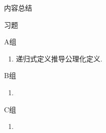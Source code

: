 \vspace{2ex}
\centerline{\heiti \Large 内容总结}

\vspace{2ex}

\centerline{\heiti \Large 习题}
\vspace{2ex}
{\kaishu }
\begin{flushright}
    \kaishu

\end{flushright}
\centerline{\heiti A组}
\begin{enumerate}
    \item 递归式定义推导公理化定义.
\end{enumerate}
\centerline{\heiti B组}
\begin{enumerate}
    \item
\end{enumerate}
\centerline{\heiti C组}
\begin{enumerate}
    \item
\end{enumerate}
